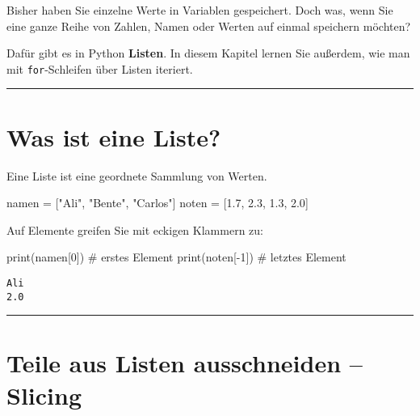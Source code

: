 \documentclass[
  letterpaper,
  DIV=11,
  numbers=noendperiod]{scrreprt}
\newenvironment{Shaded}{\begin{snugshade}}{\end{snugshade}}
\newcommand{\BuiltInTok}[1]{\textcolor[rgb]{0.00,0.23,0.31}{#1}}
\newcommand{\CommentTok}[1]{\textcolor[rgb]{0.37,0.37,0.37}{#1}}
\newcommand{\DecValTok}[1]{\textcolor[rgb]{0.68,0.00,0.00}{#1}}
\newcommand{\FloatTok}[1]{\textcolor[rgb]{0.68,0.00,0.00}{#1}}
\newcommand{\NormalTok}[1]{\textcolor[rgb]{0.00,0.23,0.31}{#1}}
\newcommand{\OperatorTok}[1]{\textcolor[rgb]{0.37,0.37,0.37}{#1}}
\newcommand{\StringTok}[1]{\textcolor[rgb]{0.13,0.47,0.30}{#1}}
\begin{document}
Bisher haben Sie einzelne Werte in Variablen gespeichert. Doch was, wenn
Sie eine ganze Reihe von Zahlen, Namen oder Werten auf einmal speichern
möchten?

Dafür gibt es in Python \textbf{Listen}. In diesem Kapitel lernen Sie
außerdem, wie man mit \texttt{for}-Schleifen über Listen iteriert.

\begin{center}\rule{0.5\linewidth}{0.5pt}\end{center}

\section{Was ist eine Liste?}\label{was-ist-eine-liste}

Eine Liste ist eine geordnete Sammlung von Werten.

\begin{Shaded}
\begin{Highlighting}[]
\NormalTok{namen }\OperatorTok{=}\NormalTok{ [}\StringTok{"Ali"}\NormalTok{, }\StringTok{"Bente"}\NormalTok{, }\StringTok{"Carlos"}\NormalTok{]}
\NormalTok{noten }\OperatorTok{=}\NormalTok{ [}\FloatTok{1.7}\NormalTok{, }\FloatTok{2.3}\NormalTok{, }\FloatTok{1.3}\NormalTok{, }\FloatTok{2.0}\NormalTok{]}
\end{Highlighting}
\end{Shaded}

Auf Elemente greifen Sie mit eckigen Klammern zu:

\begin{Shaded}
\begin{Highlighting}[]
\BuiltInTok{print}\NormalTok{(namen[}\DecValTok{0}\NormalTok{])  }\CommentTok{\# erstes Element}
\BuiltInTok{print}\NormalTok{(noten[}\OperatorTok{{-}}\DecValTok{1}\NormalTok{]) }\CommentTok{\# letztes Element}
\end{Highlighting}
\end{Shaded}

\begin{verbatim}
Ali
2.0
\end{verbatim}

\begin{center}\rule{0.5\linewidth}{0.5pt}\end{center}

\section{Teile aus Listen ausschneiden --
Slicing}\label{teile-aus-listen-ausschneiden-slicing}
\end{document}
